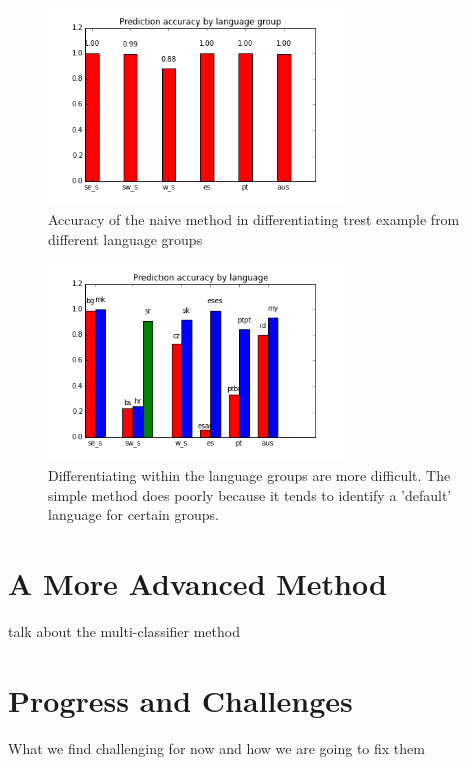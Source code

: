 \documentclass{article}
\begin{document}
\begin{figure}[h!]\label{fig:simple1}
  \centering
    \includegraphics[width=0.7\textwidth]{acc_lg_group.png}
    \caption{Accuracy of the naive method in differentiating trest example from different language groups}
\end{figure}


\begin{figure}[h!]\label{fig:simple2}
  \centering
    \includegraphics[width=0.7\textwidth]{acc_lg.png}
    \caption{Differentiating within the language groups are more difficult. The simple method does poorly because it tends to identify a 'default' language for certain groups.}
\end{figure}


\section{A More Advanced Method}
talk about the multi-classifier method

\section{Progress and Challenges}
What we find challenging for now and how we are going to fix them
\end{document}
